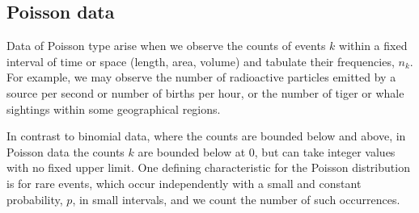 \documentclass[10pt,krantz2]{krantz}\usepackage[]{graphicx}\usepackage[]{color}
\makeatletter
\newcommand{\hlnum}[1]{\textcolor[rgb]{0.686,0.059,0.569}{#1}}%
\newcommand{\hlstr}[1]{\textcolor[rgb]{0.192,0.494,0.8}{#1}}%
\newcommand{\hlopt}[1]{\textcolor[rgb]{0,0,0}{#1}}%
\newcommand{\hlstd}[1]{\textcolor[rgb]{0.345,0.345,0.345}{#1}}%
\newcommand{\hlkwb}[1]{\textcolor[rgb]{0.69,0.353,0.396}{#1}}%
\newcommand{\hlkwc}[1]{\textcolor[rgb]{0.333,0.667,0.333}{#1}}%
\newcommand{\hlkwd}[1]{\textcolor[rgb]{0.737,0.353,0.396}{\textbf{#1}}}%
\newenvironment{kframe}{%
 \def\at@end@of@kframe{}%
 \ifinner\ifhmode%
  \def\at@end@of@kframe{\end{minipage}}%
  \begin{minipage}{\columnwidth}%
 \fi\fi%
 \def\FrameCommand##1{\hskip\@totalleftmargin \hskip-\fboxsep
 \colorbox{shadecolor}{##1}\hskip-\fboxsep
     \hskip-\linewidth \hskip-\@totalleftmargin \hskip\columnwidth}%
 \MakeFramed {\advance\hsize-\width
   \@totalleftmargin\z@ \linewidth\hsize
   \@setminipage}}%
 {\par\unskip\endMakeFramed%
 \at@end@of@kframe}
\newenvironment{knitrout}{}{} %
\renewenvironment{knitrout}{\small\renewcommand{\baselinestretch}{.85}}{} %
\makeatother
\begin{document}

\subsection{Poisson data}\label{sec:pois-data}

Data of Poisson type arise when we observe the counts of events $k$ within a
fixed interval of time or space (length, area, volume) and tabulate their
frequencies, $n_k$.  For example, we may observe the number of radioactive
particles emitted by a source per second or number of births per hour,
or the number of tiger or whale sightings within some geographical regions.

In contrast to binomial data, where the counts are bounded below and above,
in Poisson data the counts $k$ are bounded below at 0, but can take integer
values with no fixed upper limit.
One defining characteristic for the Poisson distribution is for rare
events, which occur independently with a small and constant
probability, $p$, in small intervals, and we count the number of such occurrences.
\end{document}
